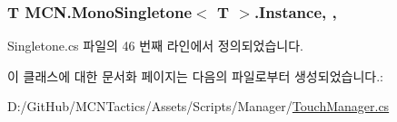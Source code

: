 \subsubsection[{\texorpdfstring{Instance}{Instance}}]{\setlength{\rightskip}{0pt plus 5cm}T {\bf M\+C\+N.\+Mono\+Singletone}$<$ T $>$.Instance\hspace{0.3cm}{\ttfamily [static]}, {\ttfamily [get]}, {\ttfamily [inherited]}}\hypertarget{class_m_c_n_1_1_mono_singletone_aa50c027cca64cf4ad30c1ee5c83e0b78}{}\label{class_m_c_n_1_1_mono_singletone_aa50c027cca64cf4ad30c1ee5c83e0b78}


Singletone.\+cs 파일의 46 번째 라인에서 정의되었습니다.



이 클래스에 대한 문서화 페이지는 다음의 파일로부터 생성되었습니다.\+:\begin{DoxyCompactItemize}
\item 
D\+:/\+Git\+Hub/\+M\+C\+N\+Tactics/\+Assets/\+Scripts/\+Manager/\hyperlink{_touch_manager_8cs}{Touch\+Manager.\+cs}\end{DoxyCompactItemize}
